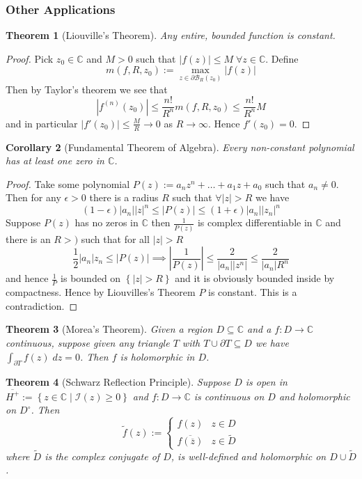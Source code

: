 \documentclass[11pt]{article}
\newcommand{\defeq}{:=}
\newcommand{\abs}[1]{\left|#1\right|}
\newcommand{\relmiddle}[1]{\mathrel{}\middle#1\mathrel{}}
\newcommand{\rmv}{\relmiddle|}
\newcommand{\C}{\mathbb{C}}
\newtheorem{theorem}{Theorem}[section]
\newtheorem{cor}[theorem]{Corollary}
\begin{document}
\subsubsection{Other Applications}

\begin{theorem}[Liouville's Theorem]
Any entire, bounded function is constant.
\end{theorem}

\begin{proof}
Pick $z_0\in\C$ and $M>0$ such that $\abs{f(z)}\leq M \; \forall z\in\C$.
Define
\[
m(f,R,z_0)\defeq\max_{z\in\partial\mathcal{B}_R(z_0)}\abs{f(z)}
\]
Then by Taylor's theorem we see that
\[
	\abs{f^{(n)}(z_0)}\leq\frac{n!}{R^n}m(f, R, z_0) \leq \frac{n!}{R^n}M
\]
and in particular $\abs{f'(z_0)}\leq\frac{M}{R}\to 0$ as $R\to\infty$.
Hence $f'(z_0)=0$.
\end{proof}

\begin{cor}[Fundamental Theorem of Algebra]
	Every non-constant polynomial has at least one zero in $\C$.
\end{cor}

\begin{proof}
Take some polynomial $P(z)\defeq a_nz^n + \dots + a_1 z + a_0$ such that $a_n\neq 0$.
Then for any $\epsilon >0$ there is a radius $R$ such that $\forall\abs{z}> R$ we have
\[
	(1-\epsilon)\abs{a_n}\abs{z}^n\leq\abs{P(z)}\leq(1+\epsilon)\abs{a_n}\abs{z_n}^n
\]
Suppose $P(z)$ has no zeros in $\C$ then $\frac{1}{P(z)}$ is complex differentiable in $\C$ and there is an $R>)$ such that for all $\abs{z}>R$
\[
	\frac{1}{2}\abs{a_n}{z_n}\leq\abs{P(z)}\implies\abs{\frac{1}{P(z)}}\leq\frac{2}{\abs{a_n}\abs{z^n}}\leq\frac{2}{\abs{a_n}R^n}
\]
and hence $\frac{1}{P}$ is bounded on $\left\{\abs{z}>R\right\}$ and it is obviously bounded inside by compactness.
Hence by Liouvilles's Theorem $P$ is constant.
This is a contradiction.
\end{proof}

\begin{theorem}[Morea's Theorem]
Given a region $D\subseteq\C$ and a $f:D\to\C$ continuous, suppose given any triangle $T$ with $T\cup\partial T\subseteq D$ we have $\int_{\partial T}f(z)\;dz=0$.
Then $f$ is holomorphic in $D$.
\end{theorem}

\begin{theorem}[Schwarz Reflection Principle]
Suppose $D$ is open in $\overline{H^+}\defeq\left\{z\in\C \rmv \mathcal{I}(z)\geq 0\right\}$ and $f:D\to\C$ is continuous on $D$ and holomorphic on $D^\circ$.
Then
\[
	\widetilde{f}(z)\defeq
	\begin{cases}
		f(z) & z\in D \\
		\overline{f(\overline{z})} & z\in\widetilde{D}
	\end{cases}
\]
where $\widetilde{D}$ is the complex conjugate of $D$, is well-defined and holomorphic on $D\cup\widetilde{D}$.
\end{theorem}
\end{document}
